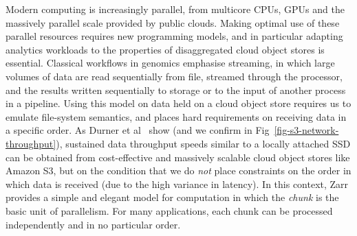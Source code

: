 \documentclass[a4paper,num-refs]{oup-contemporary}
\begin{document}
Modern computing is increasingly parallel, from multicore CPUs, GPUs 
and the massively parallel scale provided by public clouds.
Making optimal use of these parallel resources requires new programming
models, and in particular adapting analytics workloads to the properties of 
disaggregated cloud object stores is essential.
Classical workflows in genomics emphasise streaming, 
in which large volumes of data are read sequentially from file,
streamed through the processor, and the results written sequentially to 
storage or to the input of another process in a pipeline. 
Using this model on data held on a cloud object store requires
us to emulate file-system semantics,
and places hard requirements on receiving data in a specific order.
As Durner et al~\cite{durner2023exploiting} show (and we confirm 
in Fig~\ref{fig-s3-network-throughput}), sustained data throughput speeds similar to
a locally attached SSD can be obtained from cost-effective and 
massively scalable cloud object stores like Amazon S3,
but on the condition that we do \emph{not} place constraints on
the order in which data is received (due to the high variance in latency).
In this context, Zarr provides a simple and elegant model for computation
in which the \emph{chunk} is the basic unit of parallelism. For many
applications, each chunk can be processed independently and in no particular order.

\end{document}
